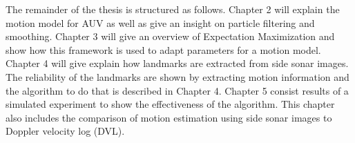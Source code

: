 \documentclass[12pt]{dalcsthesis}
\begin{document}
The remainder of the thesis is structured as follows. Chapter 2 will explain the motion model for AUV as well as give an insight on particle filtering and smoothing. Chapter 3 will give an overview of Expectation Maximization and show how this framework is used to adapt parameters for a motion model. Chapter 4 will give explain how landmarks are extracted from side sonar images. The reliability of the landmarks are shown by extracting motion information and the algorithm to do that is described in Chapter 4. Chapter 5 consist results of a simulated experiment to show the effectiveness of the algorithm. This chapter also includes the comparison of motion estimation using side sonar images to Doppler velocity log (DVL).
 

\end{document}
